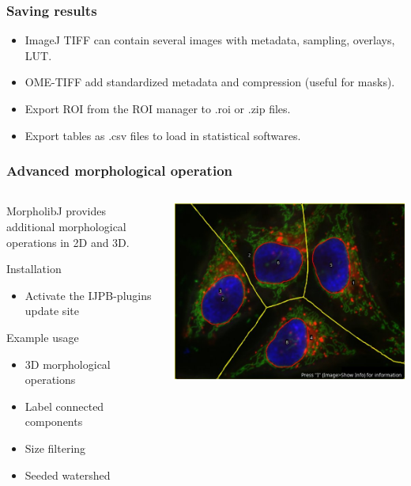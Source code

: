\documentclass[ignorenonframetext,aspectratio=169,10pt,xcolor=table]{beamer}
\begin{document}
\begin{frame} \frametitle{Saving results}
  \begin{itemize} \setlength\itemsep{2em}
  \item ImageJ TIFF can contain several images with metadata, sampling, overlays, LUT.
  \item OME-TIFF add standardized metadata and compression (useful for masks).
  \item Export ROI from the ROI manager to .roi or .zip files.
  \item Export tables as .csv files to load in statistical softwares.
  \end{itemize}
\end{frame}

\begin{frame} \frametitle{Advanced morphological operation}
  \begin{columns}
    \begin{column}{0.65\textwidth}
  MorpholibJ provides additional morphological operations in 2D and 3D.
  \begin{block}{Installation}
    \begin{itemize}
    \item Activate the IJPB-plugins update site
    \end{itemize}
  \end{block}
  \begin{block}{Example usage}
    \begin{itemize}
      \item 3D morphological operations
      \item Label connected components
      \item Size filtering
      \item Seeded watershed
      \end{itemize}
  \end{block}
\end{column}
\begin{column}{0.35\textwidth}
  \includegraphics[width=\textwidth]{seeded_watershed}
\end{column}
\end{columns}
\end{frame}
\end{document}
